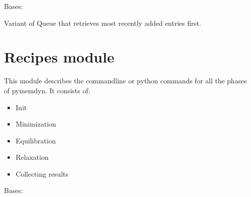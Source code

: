 \documentclass[letterpaper,10pt,english]{sphinxmanual}
\begin{document}
\begin{fulllineitems}
\label{\detokenize{queue:queue.LifoQueue}}
\pysigstartsignatures
{}
\pysigstopsignatures
\sphinxAtStartPar
Bases: {\hyperref[\detokenize{queue:queue.Queue}]{}}

\sphinxAtStartPar
Variant of Queue that retrieves most recently added entries first.

\end{fulllineitems}


\sphinxstepscope


\section{Recipes module}
\label{\detokenize{recipes:module-recipes}}\label{\detokenize{recipes:recipes-module}}\label{\detokenize{recipes::doc}}
\sphinxAtStartPar
This module describes the commandline or python commands for all the 
phases of pymemdyn. It consists of:
\begin{itemize}
\item {} 
\sphinxAtStartPar
Init

\item {} 
\sphinxAtStartPar
Minimization

\item {} 
\sphinxAtStartPar
Equilibration

\item {} 
\sphinxAtStartPar
Relaxation

\item {} 
\sphinxAtStartPar
Collecting results

\end{itemize}

\begin{fulllineitems}
\label{\detokenize{recipes:recipes.BasicInit}}
\pysigstartsignatures
{}
\pysigstopsignatures
\sphinxAtStartPar
Bases: 

\end{fulllineitems}
\end{document}
